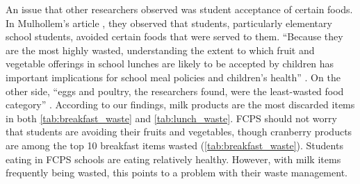 \documentclass[journal]{IEEEtran}
\begin{document}
An issue that other researchers observed was student acceptance of certain foods. In Mulhollem’s article \cite{mulhollem}, they observed that students, particularly elementary school students, avoided certain foods that were served to them. “Because they are the most highly wasted, understanding the extent to which fruit and vegetable offerings in school lunches are likely to be accepted by children has important implications for school meal policies and children’s health” \cite{mulhollem}. On the other side, “eggs and poultry, the researchers found, were the least-wasted food category” \cite{mulhollem}. According to our findings, milk products are the most discarded items in both \autoref{tab:breakfast_waste} and \autoref{tab:lunch_waste}. FCPS should not worry that students are avoiding their fruits and vegetables, though cranberry products are among the top 10 breakfast items wasted (\autoref{tab:breakfast_waste}). Students eating in FCPS schools are eating relatively healthy. However, with milk items frequently being wasted, this points to a problem with their waste management.
\end{document}
